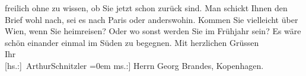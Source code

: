 \begin{ledgroupsized}[t]{13cm}
               freilich ohne zu wissen, ob Sie jetzt schon zurück sind. Man schickt Ihnen den Brief
               wohl nach, sei es nach Paris oder anderswohin.
               Kommen Sie vielleicht über Wien, wenn Sie heimreisen?
               Oder wo sonst werden Sie im Frühjahr sein? Es wäre schön einander einmal im Süden zu
               begegnen.\pend
           \pstart
           Mit herzlichen Grüssen{\\[\baselineskip]}Ihr{\\[\baselineskip]}\spacefill\mbox{{[}hs.:{]} ArthurSchnitzler}\pend
           \leftskip=0em{}\pstart
           \noindent{}{[}ms.:{]} Herrn Georg Brandes, Kopenhagen.\pend
           \endnumbering{}\end{ledgroupsized}  \newcommand{\dateiname}{L02114}\newcommand{\titel}{Arthur Schnitzler an Georg Brandes, 27. 2. 1913}\newcommand{\editorInnen}{Martin Anton Müller und Gerd-Hermann Susen}
      
